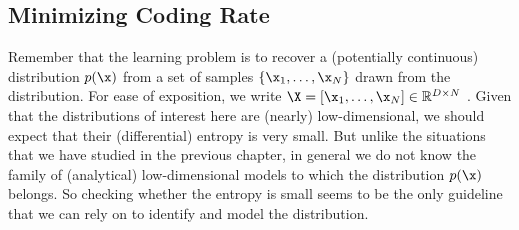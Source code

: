 \documentclass[../../book-main.tex]{subfiles}
\begin{document}
\subsection{Minimizing Coding Rate}\label{sub:min_entropy}
Remember that the learning problem is to recover a  (potentially continuous)  distribution $p(\x)$ from a set of samples $\{\x_1, \ldots, \x_N\}$ drawn from the distribution. For ease of exposition, we write $\X = [\x_1, \ldots, \x_N] \in \mathbb{R}^{D\times N}$ . Given that the distributions of interest here are (nearly) low-dimensional, we should expect that their (differential) entropy is very small. But unlike the situations that we have studied in the previous chapter, in general we do not know the family of (analytical) low-dimensional models to which the distribution $p(\x)$ belongs. So checking whether the entropy is small seems to be the only guideline that we can rely on to identify and model the distribution.
\end{document}
